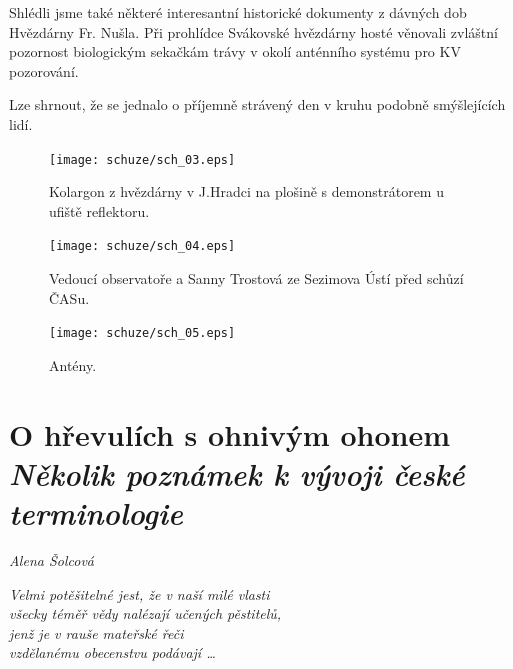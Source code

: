 \documentclass[10pt,a5paper,twoside]{book}
\newcommand{\nadpis}[2]{
\section*{#1}
	\begin{flushright}
	\textit{#2}
	\end{flushright}
}
\begin{document}
Shlédli jsme také některé interesantní historické dokumenty z dávných dob Hvězdárny Fr. Nušla.
Při prohlídce Svákovské hvězdárny hosté věnovali zvláštní pozornost biologickým sekačkám trávy v okolí anténního systému pro KV pozorování.

Lze shrnout, že se jednalo o příjemně strávený den v kruhu podobně smýšlejících lidí.

\begin{figure}[htbp]
	\begin{center}
		\texttt{[image: schuze/sch\_03.eps]}
	  	\caption{Kolargon z hvězdárny v J.Hradci na plošině s demonstrátorem u ufiště reflektoru.}
	  	\label{fig:}
	\end{center}
\end{figure}

\begin{figure}[htbp]
	\begin{center}
		\texttt{[image: schuze/sch\_04.eps]}
	  	\caption{Vedoucí observatoře a Sanny Trostová ze Sezimova Ústí před schůzí ČASu.}
	  	\label{fig:}
	\end{center}
\end{figure}

\begin{figure}[htbp]
	\begin{center}
		\texttt{[image: schuze/sch\_05.eps]}
	  	\caption{Antény.}
	  	\label{fig:}
	\end{center}
\end{figure}

\nadpis{O hřevulích s ohnivým ohonem\\\textit{Několik poznámek k vývoji české terminologie}}{Alena Šolcová}
\begin{flushright}
\textit{Velmi potěšitelné jest, že v naší milé vlasti \\
všecky téměř vědy nalézají učených pěstitelů, \\
jenž je  v rauše mateřské řeči \\
vzdělanému obecenstvu podávají …}
\end{flushright}
\end{document}
